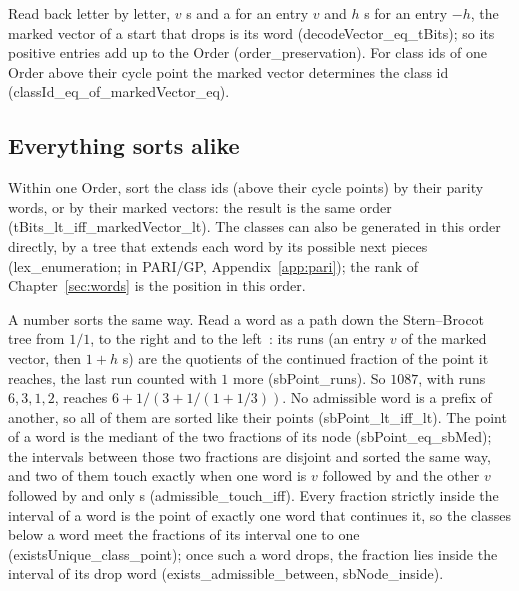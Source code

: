 \documentclass[11pt,a4paper,titlepage]{article}
\newcommand{\lean}[1]{\textsf{#1}}
\begin{document}
\nopagebreak
Read back letter by letter, $v$ s and a  for an entry $v$ and $h$
s for an entry $-h$, the marked vector of a start that drops is its word
(\lean{decodeVector\_eq\_tBits}); so its positive entries add up to the Order
(\lean{order\_preservation}). For class ids of one Order above their
cycle point the marked vector determines the class id
(\lean{classId\_eq\_of\_markedVector\_eq}).

\subsection*{Everything sorts alike}
\label{sec:sorting}

Within one Order, sort the class ids (above their cycle points) by their parity
words, or by their marked vectors: the result is the same order
(\lean{tBits\_lt\_iff\_markedVector\_lt}).
The classes can also be generated in this order directly, by a tree that
extends each word by its possible next pieces (\lean{lex\_enumeration}; in PARI/GP,
Appendix~\ref{app:pari}); the
rank of Chapter~\ref{sec:words} is the position in this order.

\nopagebreak
A number sorts the same way. Read a word as a path down the Stern--Brocot tree from $1/1$,
 to the right and  to the left~\cite{Ryde2020}: its runs (an entry $v$ of the marked
vector, then $1 + h$ s) are the quotients of the continued fraction of the point it
reaches, the last run counted with $1$ more (\lean{sbPoint\_runs}). So $1087$, with runs
$6, 3, 1, 2$, reaches $6 + 1/(3 + 1/(1 + 1/3))$. No admissible word is a prefix of another, so
all of them are sorted like their points (\lean{sbPoint\_lt\_iff\_lt}). The point of a word is
the mediant of the two fractions of its node (\lean{sbPoint\_eq\_sbMed}); the intervals between
those two fractions are disjoint and sorted the same way, and two of them touch exactly when
one word is $v$ followed by  and the other $v$ followed by  and only s
(\lean{admissible\_touch\_iff}). Every fraction strictly inside the interval of a word is
the point of exactly one word that continues it, so the classes below a word meet the
fractions of its interval one to one (\lean{existsUnique\_class\_point}); once such a word
drops, the fraction lies inside the interval of its drop word
(\lean{exists\_admissible\_between}, \lean{sbNode\_inside}).
\end{document}
